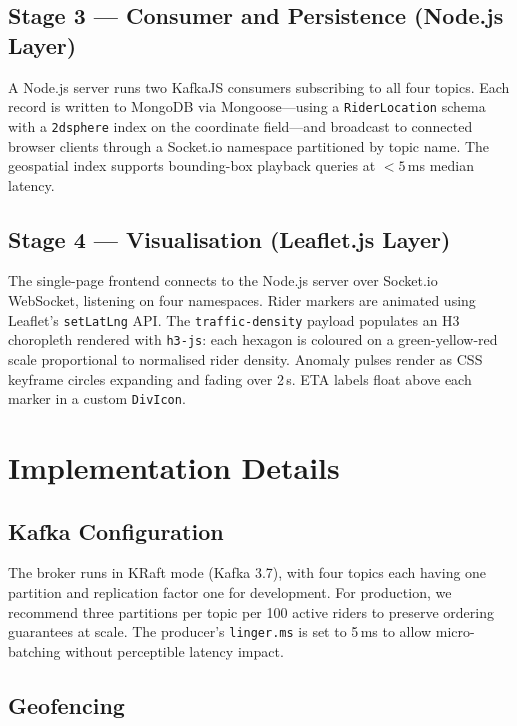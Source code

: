 \documentclass[conference]{IEEEtran}
\begin{document}
\subsection{Stage 3 — Consumer and Persistence (Node.js Layer)}

A Node.js server runs two KafkaJS consumers subscribing to all four
topics. Each record is written to MongoDB via Mongoose—using a
\texttt{RiderLocation} schema with a \texttt{2dsphere} index on the
coordinate field—and broadcast to connected browser clients through
a Socket.io namespace partitioned by topic name. The geospatial index
supports bounding-box playback queries at $<5$\,ms median latency.

\subsection{Stage 4 — Visualisation (Leaflet.js Layer)}

The single-page frontend connects to the Node.js server over Socket.io
WebSocket, listening on four namespaces. Rider markers are animated
using Leaflet's \texttt{setLatLng} API. The \texttt{traffic-density}
payload populates an H3 choropleth rendered with \texttt{h3-js}: each
hexagon is coloured on a green-yellow-red scale proportional to
normalised rider density. Anomaly pulses render as CSS keyframe circles
expanding and fading over 2\,s. ETA labels float above each marker in
a custom \texttt{DivIcon}.

\section{Implementation Details}
\label{sec:implementation}

\subsection{Kafka Configuration}

The broker runs in KRaft mode (Kafka 3.7), with four topics each
having one partition and replication factor one for development. For
production, we recommend three partitions per topic per 100 active
riders to preserve ordering guarantees at scale. The producer's
\texttt{linger.ms} is set to 5\,ms to allow micro-batching without
perceptible latency impact.

\subsection{Geofencing}
\end{document}
